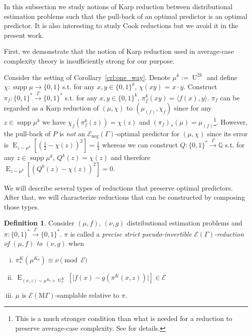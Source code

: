 \documentclass{article}
\numberwithin{equation}{section}
\theoremstyle{definition}
\newtheorem{definition}{Definition}[section]
\theoremstyle{plain}
\newcommand{\Bool}{\{0,1\}}
\newcommand{\Words}{{\Bool^*}}
\DeclareMathOperator{\Supp}{supp}
\DeclareMathOperator{\E}{E}
\DeclareMathOperator{\Un}{U}
\newcommand{\Rats}{\mathbb{Q}}
\newcommand{\Abs}[1]{\lvert #1 \rvert}
\newcommand{\Chev}[1]{\langle #1 \rangle}
\newcommand{\MGrow}{\mathrm{M}\Gamma}
\newcommand{\Fall}{\mathcal{E}}
\newcommand{\EG}{\Fall(\Gamma)}
\newcommand{\EMG}{\Fall(\MGrow)}
\newcommand{\Scheme}{\xrightarrow{\Gamma}}
\begin{document}
In this subsection we study notions of Karp reduction between distributional estimation problems such that the pull-back of an optimal predictor is an optimal predictor. It is also interesting to study Cook reductions but we avoid it in the present work.

First, we demonstrate that the notion of Karp reduction used in average-case complexity theory is insufficiently strong for our purpose. 

Consider the setting of Corollary~\ref{crl:one_way}. Denote $\mu^k:=\Un^{2k}$ and define ${\chi: \Supp \mu \rightarrow \Bool}$ s.t. for any $x,y \in \Bool^k$, $\chi(xy)$ = $x \cdot y$. Construct $\pi_f: \Words \Scheme \Words$ s.t. for any $x,y \in \Bool^k$,  $\pi_f^k(xy) = \Chev{f(x),y}$. $\pi_f$ can be regarded as a Karp reduction of $(\mu, \chi)$ to $(\mu_{(f)},\chi_f)$ since for any $z \in \Supp \mu^k$ we have $\chi_f(\pi_f^k(z))=\chi(z)$ and $(\pi_f)_*(\mu)=\mu_{(f)}$\footnote{This is a much stronger condition than what is needed for a reduction to preserve average-case complexity. See \cite{Bogdanov_2006} for details.}. However, the pull-back of $P$ is \emph{not} an $\Fall_{\text{neg}}(\Gamma)$-optimal predictor for $(\mu,\chi)$ since its error is $\E_{z \sim \mu^k}[(\frac{1}{2}-\chi(z))^2]=\frac{1}{4}$ whereas we can construct $Q: \Words \Scheme \Rats$ s.t. for any $z \in \Supp \mu^k$, $Q^k(z)=\chi(z)$ and therefore $\E_{z \sim \mu^k}[(Q^k(z)-\chi(z))^2]=0$.

We will describe several types of reductions that preserve optimal predictors. After that, we will characterize reductions that can be constructed by composing those types.

\begin{samepage}
\begin{definition}

Consider $(\mu,f)$, $(\nu,g)$ distributional estimation problems and $\pi: \Words \Scheme \Words$. $\pi$ is called a \emph{precise strict pseudo-invertible $\EG$-reduction of $(\mu,f)$ to $(\nu,g)$} when

\begin{enumerate}[(i)]

\item $\pi_*^K(\mu^{K_0}) \equiv \nu \pmod \Fall$

\item $\E_{(x,z) \sim \mu^{K_0} \times \Un_\pi^{K}}[\Abs{f(x)-g(\pi^{K}(x,z))}] \in \Fall$

\item $\mu$ is $\EMG$-samplable relative to $\pi$.

\end{enumerate}

\end{definition}
\end{samepage}
\end{document}
